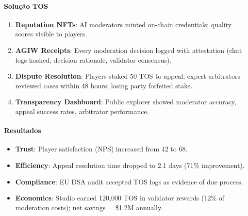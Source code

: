 \documentclass[11pt]{article}
\begin{document}
\begin{itemize}[noitemsep]
\begin{itemize}[noitemsep]
\begin{itemize}[noitemsep]
\paragraph{Solução TOS}
\begin{enumerate}[noitemsep]
  \item \textbf{Reputation NFTs}: AI moderators minted on-chain credentials; quality scores visible to players.
  \item \textbf{AGIW Receipts}: Every moderation decision logged with attestation (chat logs hashed, decision rationale, validator consensus).
  \item \textbf{Dispute Resolution}: Players staked 50 TOS to appeal; expert arbitrators reviewed cases within 48 hours; losing party forfeited stake.
  \item \textbf{Transparency Dashboard}: Public explorer showed moderator accuracy, appeal success rates, arbitrator performance.
\end{enumerate}

\paragraph{Resultados}
\begin{itemize}[noitemsep]
  \item \textbf{Trust}: Player satisfaction (NPS) increased from 42 to 68.
  \item \textbf{Efficiency}: Appeal resolution time dropped to 2.1 days (71\% improvement).
  \item \textbf{Compliance}: EU DSA audit accepted TOS logs as evidence of due process.
  \item \textbf{Economics}: Studio earned 120,000 TOS in validator rewards (12\% of moderation costs); net savings = \$1.2M annually.
\end{itemize}


\end{itemize}
\end{itemize}
\end{itemize}
\end{document}
